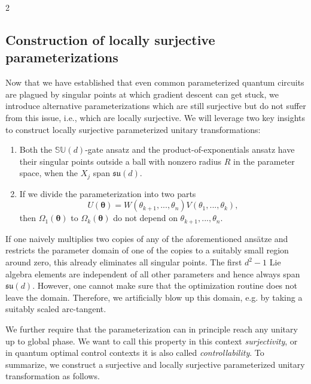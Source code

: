 \documentclass{article}
\renewcommand{\vec}[1]{\ensuremath{\boldsymbol{#1}}}
\begin{document}
\begin{multicols}{2}
\subsection{Construction of locally surjective parameterizations}
\label{sec:construction}
Now that we have established that even common parameterized quantum circuits are plagued by singular points at which gradient descent can get stuck, we introduce alternative parameterizations which are still surjective but do not suffer from this issue, i.e., which are locally surjective.
We will leverage two key insights to construct locally surjective parameterized unitary transformations: 
\begin{enumerate}
    \item Both the \(\mathbb{SU}(d)\)-gate ansatz and the product-of-exponentials ansatz have their singular points outside a ball with nonzero radius \(R\) in the parameter space, when the \(X_j\) span \(\mathfrak{su}(d)\).
    \item If we divide the parameterization into two parts
    \begin{equation}
        U(\vec{\theta}) = W(\theta_{k+1}, ..., \theta_n) V(\theta_1, ..., \theta_k),
    \end{equation} then \(\Omega_1(\vec{\theta})\) to \(\Omega_k(\vec{\theta})\) do not depend on \(\theta_{k+1}, ...,\theta_n\).
\end{enumerate}
If one naively multiplies two copies of any of the aforementioned ansätze and restricts the parameter domain of one of the copies to a suitably small region around zero, this already eliminates all singular points. The first \(d^2-1\) Lie algebra elements are independent of all other parameters and hence always span \(\mathfrak{su}(d)\).
However, one cannot make sure that the optimization routine does not leave the domain.
Therefore, we artificially blow up this domain, e.g. by taking a suitably scaled arc-tangent.

We further require that the parameterization can in principle reach any unitary up to global phase.
We want to call this property in this context \emph{surjectivity}, or in quantum optimal control contexts it is also called \emph{controllability}. To summarize, we construct a surjective and locally surjective parameterized unitary transformation as follows.


\end{multicols}
\end{document}
